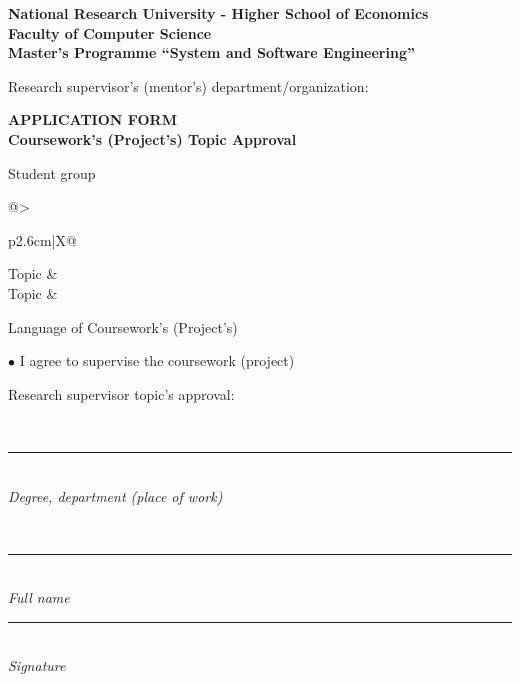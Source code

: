 \documentclass[12pt,a4paper]{article}
\newcommand{\hseSignField}[2]{%
  \begin{minipage}[t]{#1}\centering
    \rule{\linewidth}{0.4pt}\\[-2pt]{\footnotesize\itshape #2}
  \end{minipage}}
\newcommand{\hseFilledField}[3]{%
  \begin{minipage}[t]{#1}\centering
    {\small\strut #2}\\[-4pt]\rule{\linewidth}{0.4pt}\\[-2pt]{\footnotesize\itshape #3}
  \end{minipage}}
\begin{document}
\clearpage
\begin{otherlanguage}{english}
\begin{center}
\textbf{National Research University - Higher School of Economics}\\[4pt]
\textbf{Faculty of Computer Science}\\[4pt]
\textbf{Master’s Programme “System and Software Engineering”}
\end{center}

\vspace{0.6cm}
\begin{minipage}[t]{0.5\textwidth}\raggedright
\small Research supervisor's (mentor's) department/organization:\\
\foreignlanguage{russian}{\hseSupervisorDepartment}
\end{minipage}

\vspace{0.6cm}
\begin{center}
\textbf{APPLICATION FORM}\\
\textbf{Coursework's (Project's) Topic Approval}
\end{center}

\vspace{0.4cm}
Student \underline{} group \underline{}

\vspace{0.6cm}
\begin{tabularx}{\textwidth}{@{}>{\raggedright\arraybackslash}p{2.6cm}|X@{}}
Topic & \foreignlanguage{russian}{\hseTitleRu} \\[0.6cm]
Topic & \hseTitleEn \\
\end{tabularx}

\vspace{0.6cm}
Language of Coursework’s (Project’s)\underline{\makebox[4cm][l]{\ \hseWorkLangEn}}

\vspace{0.5cm}
$\bullet$ I agree to supervise the coursework (project)

\vspace{0.3cm}
\begin{minipage}[t]{0.27\textwidth}\raggedright Research supervisor topic's approval:\end{minipage}%
\hseFilledField{0.3\textwidth}{\foreignlanguage{russian}{\hseSupervisorTitle\ifdefempty{\hseSupervisorDegree}{}{, \hseSupervisorDegree}}}{Degree, department (place of work)}\hfill
\hseFilledField{0.22\textwidth}{\foreignlanguage{russian}{\hseSupervisorShortName}}{Full name}\hfill
\hseSignField{0.15\textwidth}{Signature}


\end{otherlanguage}
\end{document}
